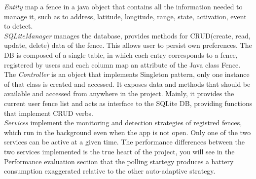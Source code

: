 \documentclass[conference]{IEEEtran}
\begin{document}
\textit{Entity} map a fence in a java object that contains all the information needed to manage it, such as to address, latitude, longitude, range, state, activation, event to detect.\\
\textit{SQLiteManager} manages the database, provides methods for CRUD(create, read, update, delete) data of the fence.
This allows user to persist own preferences.
The DB is composed of a single table, in which each entry corresponds to a fence, registered by users and each column map an attribute of the Java class Fence.\\
The \textit{Controller} is an object that implements Singleton pattern, only one instance of that class is created and accessed.
It exposes data and methods that should be available and accessed from anywhere in the project.
Mainly, it provides the current user fence list and acts as interface to the SQLite DB, providing functions that implement CRUD verbs.\\
\textit{Services} implement the monitoring and detection strategies of registred fences, which run in the background even when the app is not open.
Only one of the two services can be active at a given time.
The performance differences between the two services implemented is the true heart of the project, you will see in the Performance evaluation section
that the polling startegy produces a battery consumption exaggerated relative to the other auto-adaptive strategy.
\end{document}

